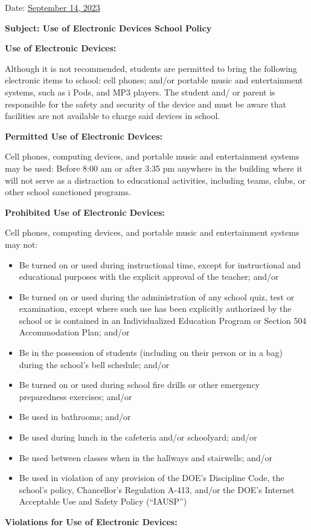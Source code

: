 \documentclass[12pt,letterpaper]{article}
\begin{document}
\vspace*{0.5in}
Date: \href{https://www.ps192.org/apps/bbmessages/show_bbm.jsp?REC_ID=139439}{September 14, 2023} 

\textbf{Subject: Use of Electronic Devices School Policy}

\textbf{Use of Electronic Devices:}

Although it is not recommended, students are permitted to bring the following
electronic items to school: cell phones; and/or portable music and entertainment
systems, such as i Pods, and MP3 players. The student and/ or parent is 
responsible for the safety and security of the device and must be aware that
facilities are not available to charge said devices in school.

\textbf{Permitted Use of Electronic Devices:}

Cell phones, computing devices, and portable music and entertainment systems may be used: Before 8:00 am or after 3:35 pm anywhere in the building where it will 
not serve as a distraction to educational activities, including teams, clubs, or
other school sanctioned programs.

\textbf{Prohibited Use of Electronic Devices:}

Cell phones, computing devices, and portable music and entertainment systems may not:
\begin{itemize}
\item Be turned on or used during instructional time, except for instructional and educational purposes with the explicit approval of the teacher; and/or 
\item Be turned on or used during the administration of any school quiz, test or
examination, except where such use has been explicitly authorized by the school 
or is contained in an Individualized Education Program or Section 504
Accommodation Plan; and/or 
\item Be in the possession of students (including on their person or in a bag)
during the school’s bell schedule; and/or 
\item Be turned on or used during school fire drills or other emergency
preparedness exercises; and/or
\item Be used in bathrooms; and/or 
\item Be used during lunch in the cafeteria and/or schoolyard; and/or 
\item Be used between classes when in the hallways and stairwells; and/or 
\pagebreak
\vspace*{2cm}
\item Be used in violation of any provision of the DOE’s Discipline Code, the 
school’s policy, Chancellor’s Regulation A-413, and/or the DOE’s Internet 
Acceptable Use and Safety Policy (“IAUSP”)
\end{itemize}
\textbf{Violations for Use of Electronic Devices:}
\end{document}

